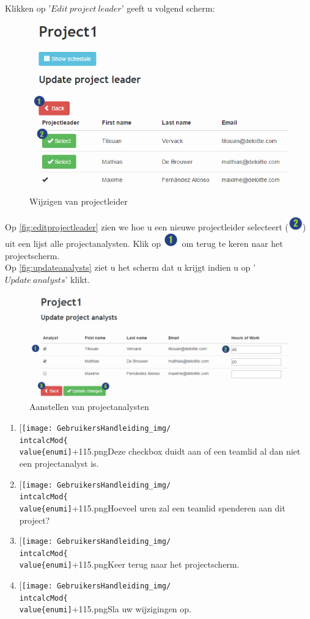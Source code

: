 \documentclass[a4paper,11pt]{article}
\newcommand{\one}{\includegraphics[scale=0.5]{Gebruikershandleiding_img/1.png}}
\newcommand{\two}{\includegraphics[scale=0.5]{Gebruikershandleiding_img/2.png}}
\newcommand*{\myitem}{
 \item[{\texttt{[image: GebruikersHandleiding\_img/\\intcalcMod\{\\value\{enumi]}+1}{15}.png}}]\stepcounter{enumi}
\begin{document}
Klikken op '$Edit\ project\ leader$' geeft u volgend scherm:
\begin{figure}[H]
\centering
\includegraphics[scale=0.5]{Gebruikershandleiding_img/editprojectleader.png}
\caption{Wijzigen van projectleider}
\label{fig:editprojectleader}
\end{figure}
Op \autoref{fig:editprojectleader} zien we hoe u een nieuwe projectleider selecteert (\two) uit een lijst alle projectanalysten. Klik op \one\ om terug te keren naar het projectscherm.\\

Op \autoref{fig:updateanalysts} ziet u het scherm dat u krijgt indien u op '$Update\ analysts$' klikt.
\begin{figure}[H]
\centering
\includegraphics[scale=0.5]{Gebruikershandleiding_img/updateanalysts.png}
\caption{Aanstellen van projectanalysten}
\label{fig:updateanalysts}
\end{figure}
\begin{enumerate}
\myitem Deze checkbox duidt aan of een teamlid al dan niet een projectanalyst is.
\myitem Hoeveel uren zal een teamlid spenderen aan dit project?
\myitem Keer terug naar het projectscherm.
\myitem Sla uw wijzigingen op.
\end{enumerate}
\end{document}

